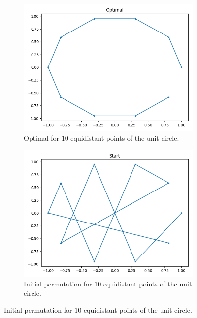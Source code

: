 \begin{figure}[H]
        \centering
        \begin{subfigure}[H]{0.475\textwidth}
            \centering
            \includegraphics[width=\textwidth]{figures/optimal.png}
            \caption[Network2]%
            {{\small Optimal for $10$ equidistant points of the unit circle.}}    
            \label{fig:Star4}
        \end{subfigure}
        \hfill
        \begin{subfigure}[H]{0.475\textwidth}  
            \centering 
            \includegraphics[width=\textwidth]{figures/start.png}
            \caption[]%
            {{\small Initial permutation for $10$ equidistant points of the unit circle.}}    

\end{subfigure}
\end{figure}

